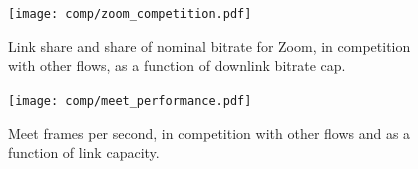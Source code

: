 \begin{figure}[]
    \texttt{[image: comp/zoom\_competition.pdf]}
    \caption{Link share and share of nominal bitrate for Zoom, in competition with other flows, as a function of downlink bitrate cap.}
	\label{fig:zoom_comp_bitrates}
\end{figure}

\begin{figure}[]
    \texttt{[image: comp/meet\_performance.pdf]}
    \caption{Meet frames per second, in competition with other flows and as a function of link capacity.}
	\label{fig:meet_comp_performance}
\end{figure}


